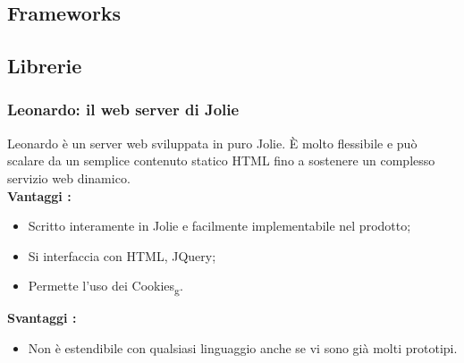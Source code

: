 {	\subsection{Frameworks}{
		
	
	}
	\subsection{Librerie}{
		\subsubsection{Leonardo: il web server di Jolie}{
			Leonardo è un server web sviluppata in puro Jolie. È molto flessibile e può scalare da un semplice contenuto statico HTML fino a sostenere un complesso servizio web dinamico.\\
			\textbf{Vantaggi :}
			\begin{itemize}\itemsep1pt
				\item Scritto interamente in Jolie e facilmente implementabile nel prodotto;
				\item Si interfaccia con HTML, JQuery;
				\item Permette l'uso dei Cookies\textsubscript{g}.	
			\end{itemize}
			\textbf{Svantaggi :}
			\begin{itemize}\itemsep1pt
				\item Non è estendibile con qualsiasi linguaggio anche se vi sono già molti prototipi.
			\end{itemize}
		}
	}
}
